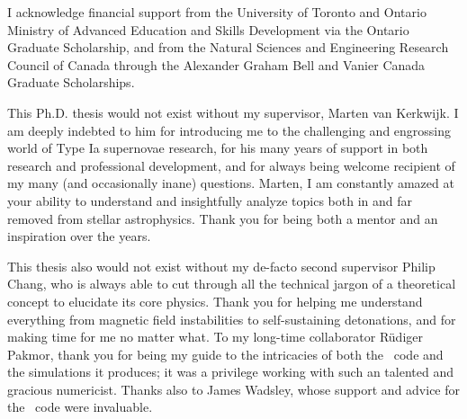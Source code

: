 \documentclass{ut-thesis}
\begin{document}
\begin{preliminary}

\cleardoublepage


\begin{acknowledgements}

I acknowledge financial support from the University of Toronto and Ontario Ministry of Advanced Education and Skills Development via the Ontario Graduate Scholarship, and from the Natural Sciences and Engineering Research Council of Canada through the Alexander Graham Bell and Vanier Canada Graduate Scholarships.

This Ph.D. thesis would not exist without my supervisor, Marten van Kerkwijk.  I am deeply indebted to him for introducing me to the challenging and engrossing world of Type Ia supernovae research, for his many years of support in both research and professional development, and for always being welcome recipient of my many (and occasionally inane) questions.  Marten, I am constantly amazed at your ability to understand and insightfully analyze topics both in and far removed from stellar astrophysics.  Thank you for being both a mentor and an inspiration over the years.

This thesis also would not exist without my de-facto second supervisor Philip Chang, who is always able to cut through all the technical jargon of a theoretical concept to elucidate its core physics.  Thank you for helping me understand everything from magnetic field instabilities to self-sustaining detonations, and for making time for me no matter what.  To my long-time collaborator R\"{u}diger Pakmor, thank you for being my guide to the intricacies of both the \arepo\ code and the simulations it produces; it was a privilege working with such an talented and gracious numericist.  Thanks also to James Wadsley, whose support and advice for the \gasoline\ code were invaluable.


\end{acknowledgements}
\end{preliminary}
\end{document}
